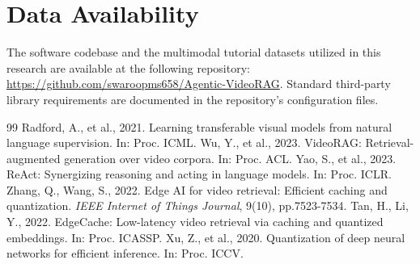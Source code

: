 \documentclass[preprint,12pt]{elsarticle}
\begin{document}
\section*{Data Availability}
The software codebase and the multimodal tutorial datasets utilized in this research are available at the following repository: \url{https://github.com/swaroopms658/Agentic-VideoRAG}. Standard third-party library requirements are documented in the repository's configuration files.


\begin{thebibliography}{99}
 Radford, A., et al., 2021. Learning transferable visual models from natural language supervision. In: Proc. ICML.
 Wu, Y., et al., 2023. VideoRAG: Retrieval-augmented generation over video corpora. In: Proc. ACL.
 Yao, S., et al., 2023. ReAct: Synergizing reasoning and acting in language models. In: Proc. ICLR.
 Zhang, Q., Wang, S., 2022. Edge AI for video retrieval: Efficient caching and quantization. \textit{IEEE Internet of Things Journal}, 9(10), pp.7523-7534.
 Tan, H., Li, Y., 2022. EdgeCache: Low-latency video retrieval via caching and quantized embeddings. In: Proc. ICASSP.
 Xu, Z., et al., 2020. Quantization of deep neural networks for efficient inference. In: Proc. ICCV.
\end{thebibliography}
\end{document}
